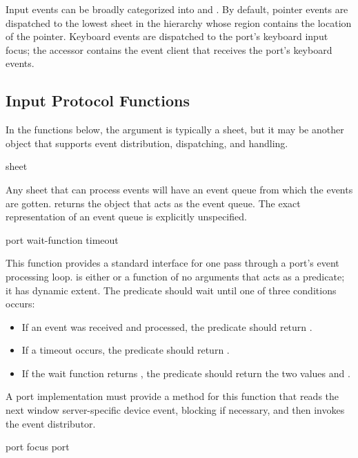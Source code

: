 Input events can be broadly categorized into  and
.  By default, pointer events are dispatched to the
lowest sheet in the hierarchy whose region contains the location of the pointer.
Keyboard events are dispatched to the port's keyboard input focus; the accessor
 contains the event client that receives the
port's keyboard events.


\subsection {Input Protocol Functions}

In the functions below, the  argument is typically a sheet, but it
may be another object that supports event distribution, dispatching, and
handling.

 {sheet}

Any sheet that can process events will have an event queue from which the events
are gotten.   returns the object that acts as the event
queue.  The exact representation of an event queue is explicitly unspecified.

 {port \key wait-function timeout}

This function provides a standard interface for one pass through a port's event
processing loop.   is either  or a function of no
arguments that acts as a predicate; it has dynamic extent.  The predicate should
wait until one of three conditions occurs:

\begin{itemize}
\item If an event was received and processed, the predicate should return
.

\item If a timeout occurs, the predicate should return .

\item If the wait function returns , the predicate should return the
two values  and .
\end{itemize}

A port implementation must provide a method for this function that reads the
next window server-specific device event, blocking if necessary, and then
invokes the event distributor.

 {port}
 {focus port}


